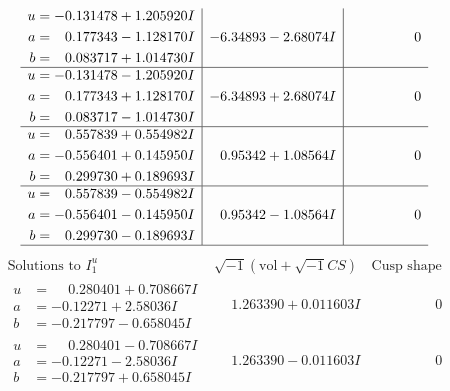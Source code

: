 \documentclass[1p]{elsarticle_modified}
\theoremstyle{definition}
\newcommand{\I}{\sqrt{-1}}
\begin{document}
$$\begin{array}{c|c|c}
\begin{aligned}
u &= -0.131478 + 1.205920 I \\
a &= \phantom{-}0.177343 - 1.128170 I \\
b &= \phantom{-}0.083717 + 1.014730 I\end{aligned}
 & -6.34893 - 2.68074 I & \phantom{-0.000000 } 0 \\ \hline\begin{aligned}
u &= -0.131478 - 1.205920 I \\
a &= \phantom{-}0.177343 + 1.128170 I \\
b &= \phantom{-}0.083717 - 1.014730 I\end{aligned}
 & -6.34893 + 2.68074 I & \phantom{-0.000000 } 0 \\ \hline\begin{aligned}
u &= \phantom{-}0.557839 + 0.554982 I \\
a &= -0.556401 + 0.145950 I \\
b &= \phantom{-}0.299730 + 0.189693 I\end{aligned}
 & \phantom{-}0.95342 + 1.08564 I & \phantom{-0.000000 } 0 \\ \hline\begin{aligned}
u &= \phantom{-}0.557839 - 0.554982 I \\
a &= -0.556401 - 0.145950 I \\
b &= \phantom{-}0.299730 - 0.189693 I\end{aligned}
 & \phantom{-}0.95342 - 1.08564 I & \phantom{-0.000000 } 0\\
 \hline 
 \end{array}$$\newpage$$\begin{array}{c|c|c}  
\text{Solutions to }I^u_{1}& \I (\text{vol} + \sqrt{-1}CS) & \text{Cusp shape}\\
 \hline 
\begin{aligned}
u &= \phantom{-}0.280401 + 0.708667 I \\
a &= -0.12271 + 2.58036 I \\
b &= -0.217797 - 0.658045 I\end{aligned}
 & \phantom{-}1.263390 + 0.011603 I & \phantom{-0.000000 } 0 \\ \hline\begin{aligned}
u &= \phantom{-}0.280401 - 0.708667 I \\
a &= -0.12271 - 2.58036 I \\
b &= -0.217797 + 0.658045 I\end{aligned}
 & \phantom{-}1.263390 - 0.011603 I & \phantom{-0.000000 } 0 \\ \hline\begin{aligned}

\end{aligned}
\end{array}$$
\end{document}
